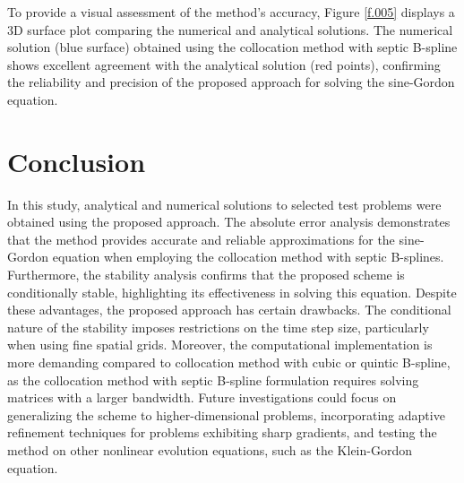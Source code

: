 \documentclass[10pt,letterpaper,twoside]{article}
\begin{document}
To provide a visual assessment of the method's accuracy, Figure \ref{f.005} displays a 3D surface plot comparing the numerical and analytical solutions. The numerical solution (blue surface) obtained using the collocation method with septic B-spline shows excellent agreement with the analytical solution (red points), confirming the reliability and precision of the proposed approach for solving the sine-Gordon equation.

\section{Conclusion}
In this study, analytical and numerical solutions to selected test problems were obtained using the proposed approach. The absolute error analysis demonstrates that the method provides accurate and reliable approximations for the sine-Gordon equation when employing the collocation method with septic B-splines. Furthermore, the stability analysis confirms that the proposed scheme is conditionally stable, highlighting its effectiveness in solving this equation. Despite these advantages, the proposed approach has certain drawbacks. The conditional nature of the stability imposes restrictions on the time step size, particularly when using fine spatial grids. Moreover, the computational implementation is more demanding compared to collocation method with cubic or quintic B-spline, as the collocation method with septic B-spline formulation requires solving matrices with a larger bandwidth. Future investigations could focus on generalizing the scheme to higher-dimensional problems, incorporating adaptive refinement techniques for problems exhibiting sharp gradients, and testing the method on other nonlinear evolution equations, such as the Klein-Gordon equation.
\end{document}

